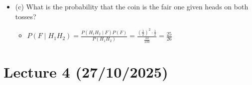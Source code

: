 \documentclass{article}
\begin{document}
\begin{itemize}
\begin{itemize}
\begin{itemize}
\begin{itemize}
            \end{itemize}
            \item (c) What is the probability that the coin is the fair one given heads on both tosses?
            \begin{itemize}
                \item $P(F \mid H_1H_2) = \frac{P(H_1H_2 \mid F)P(F)}{P(H_1H_2)} = \frac{\left(\frac{1}{2}\right)^2 \cdot \frac{1}{2}}{\frac{13}{100}} = \frac{25}{26}$
            \end{itemize}
        \end{itemize}
    \end{itemize}
\end{itemize}

\section{Lecture 4 (27/10/2025)}
\end{document}
